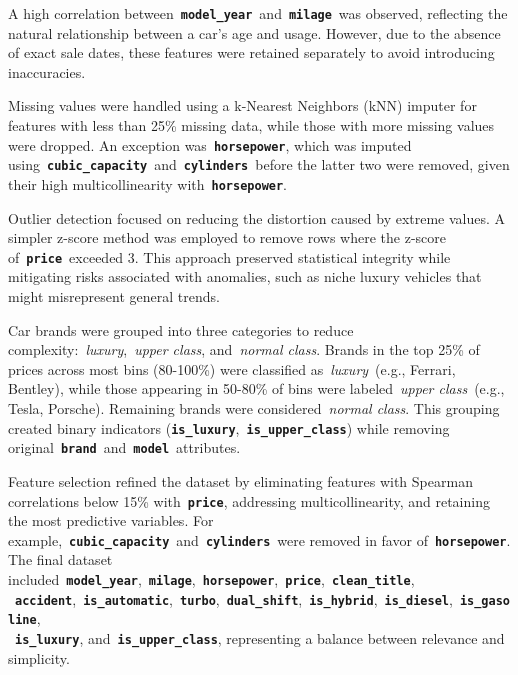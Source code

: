 \documentclass[a4paper,oneside,bibliography=totoc]{scrbook}
\begin{document}
A high correlation between~\textbf{\texttt{model\_year}}~and~\textbf{\texttt{milage}}~was observed, reflecting the natural relationship between a car's age and usage. However, due to the absence of exact sale dates, these features were retained separately to avoid introducing inaccuracies.

Missing values were handled using a k-Nearest Neighbors (kNN) imputer for features with less than 25\% missing data, while those with more missing values were dropped. An exception was~\textbf{\texttt{horsepower}}, which was imputed using~\textbf{\texttt{cubic\_capacity}}~and~\textbf{\texttt{cylinders}}~before the latter two were removed, given their high multicollinearity with~\textbf{\texttt{horsepower}}.

Outlier detection focused on reducing the distortion caused by extreme values. A simpler z-score method was employed to remove rows where the z-score of~\textbf{\texttt{price}}~exceeded 3. This approach preserved statistical integrity while mitigating risks associated with anomalies, such as niche luxury vehicles that might misrepresent general trends.

Car brands were grouped into three categories to reduce complexity:~\emph{luxury},~\emph{upper class}, and~\emph{normal class}. Brands in the top 25\% of prices across most bins (80-100\%) were classified as~\emph{luxury}~(e.g., Ferrari, Bentley), while those appearing in 50-80\% of bins were labeled~\emph{upper class}~(e.g., Tesla, Porsche). Remaining brands were considered~\emph{normal class}. This grouping created binary indicators (\textbf{\texttt{is\_luxury}},~\textbf{\texttt{is\_upper\_class}}) while removing original~\textbf{\texttt{brand}}~and~\textbf{\texttt{model}}~attributes.

Feature selection refined the dataset by eliminating features with Spearman correlations below 15\% with~\textbf{\texttt{price}}, addressing multicollinearity, and retaining the most predictive variables. For example,~\textbf{\texttt{cubic\_capacity}}~and~\textbf{\texttt{cylinders}}~were removed in favor of~\textbf{\texttt{horsepower}}. The final dataset included~\textbf{\texttt{model\_year}},~\textbf{\texttt{milage}},~\textbf{\texttt{horsepower}},~\textbf{\texttt{price}},~\textbf{\texttt{clean\_title}},\\~\textbf{\texttt{accident}},~\textbf{\texttt{is\_automatic}},~\textbf{\texttt{turbo}},~\textbf{\texttt{dual\_shift}},~\textbf{\texttt{is\_hybrid}},~\textbf{\texttt{is\_diesel}},~\textbf{\texttt{is\_gasoline}},\\~\textbf{\texttt{is\_luxury}}, and~\textbf{\texttt{is\_upper\_class}}, representing a balance between relevance and simplicity.
\end{document}

